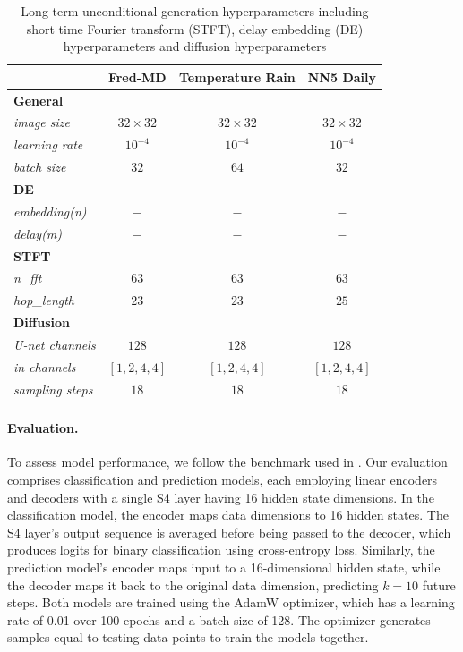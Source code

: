 \documentclass{article}
\begin{document}
\begin{table}[!ht]
    \centering
    \caption{Long-term unconditional generation hyperparameters including short time Fourier transform (STFT), delay embedding (DE) hyperparameters and diffusion hyperparameters}
    \label{tab:long-hp_long}
    \setlength{\tabcolsep}{8pt} %
    \begin{tabular}{lccc}
        \toprule
        & \textbf{Fred-MD} & \textbf{Temperature Rain} & \textbf{NN5 Daily} \\
        \midrule
        \textbf{General} \\
        \emph{image size}  & $32 \times 32$ & $32 \times 32$ & $32 \times 32$  \\
        \emph{learning rate} & $10^{-4}$ & $10^{-4}$ & $10^{-4}$  \\
        \emph{batch size} & $32$ & $64$ & $32$  \\
        \midrule
        \textbf{DE} \\
        \emph{embedding(n)} & $-$ & $-$ & $-$   \\
        \emph{delay(m)} & $-$ & $-$ & $-$ \\
        \midrule
        \textbf{STFT} \\
        \emph{n\_fft} & $63$ & $63$ & $63$ \\
        \emph{hop\_length} & $23$ & $23$ & $25$ \\
        \midrule
        \textbf{Diffusion} \\
        \emph{U-net channels} & $128$ & $128$ & $128$  \\
        \emph{in channels} & $[1, 2, 4, 4]$ & $[1, 2, 4, 4]$ & $[1, 2, 4, 4]$ \\
        \emph{sampling steps} & $18$ & $18$ & $18$  \\
        \bottomrule
    \end{tabular}
\end{table}

\paragraph{Evaluation.} To assess model performance, we follow the benchmark used in \cite{zhou2023deep}. Our evaluation comprises classification and prediction models, each employing linear encoders and decoders with a single S4 layer having 16 hidden state dimensions. In the classification model, the encoder maps data dimensions to 16 hidden states. The S4 layer's output sequence is averaged before being passed to the decoder, which produces logits for binary classification using cross-entropy loss. Similarly, the prediction model's encoder maps input to a 16-dimensional hidden state, while the decoder maps it back to the original data dimension, predicting $k = 10$ future steps. Both models are trained using the AdamW optimizer, which has a learning rate of 0.01 over 100 epochs and a batch size of 128. The optimizer generates samples equal to testing data points to train the models together.
\end{document}
